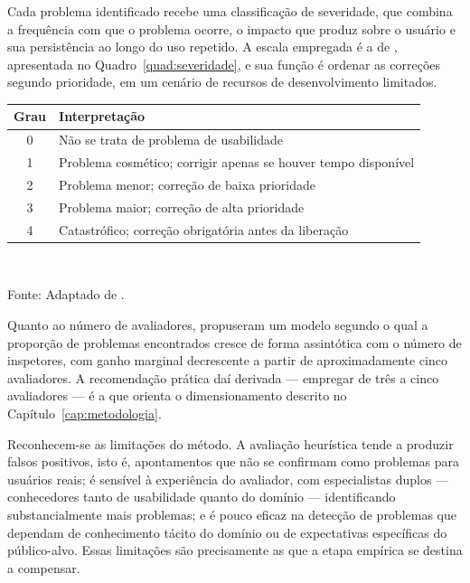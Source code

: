 Cada problema identificado recebe uma classificação de severidade, que combina a
frequência com que o problema ocorre, o impacto que produz sobre o usuário e sua
persistência ao longo do uso repetido. A escala empregada é a de
, apresentada no
Quadro~\ref{quad:severidade}, e sua função é ordenar as correções segundo
prioridade, em um cenário de recursos de desenvolvimento limitados.

\begin{quadro}[htb]
\centering
\caption{Escala de severidade de problemas de usabilidade}
\label{quad:severidade}
\begin{tabular}{c p{9.6cm}}
\toprule
\textbf{Grau} & \textbf{Interpretação} \\
\midrule
0 & Não se trata de problema de usabilidade \\
1 & Problema cosmético; corrigir apenas se houver tempo disponível \\
2 & Problema menor; correção de baixa prioridade \\
3 & Problema maior; correção de alta prioridade \\
4 & Catastrófico; correção obrigatória antes da liberação \\
\bottomrule
\end{tabular}
\\[4pt]
\begin{flushleft}
Fonte: Adaptado de .
\end{flushleft}
\end{quadro}

Quanto ao número de avaliadores,  propuseram um
modelo segundo o qual a proporção de problemas encontrados cresce de forma
assintótica com o número de inspetores, com ganho marginal decrescente a partir
de aproximadamente cinco avaliadores. A recomendação prática daí derivada ---
empregar de três a cinco avaliadores --- é a que orienta o dimensionamento
descrito no Capítulo~\ref{cap:metodologia}.

Reconhecem-se as limitações do método. A avaliação heurística tende a produzir
falsos positivos, isto é, apontamentos que não se confirmam como problemas para
usuários reais; é sensível à experiência do avaliador, com especialistas duplos
--- conhecedores tanto de usabilidade quanto do domínio --- identificando
substancialmente mais problemas; e é pouco eficaz na detecção de problemas que
dependam de conhecimento tácito do domínio ou de expectativas específicas do
público-alvo. Essas limitações são precisamente as que a etapa empírica se
destina a compensar.

